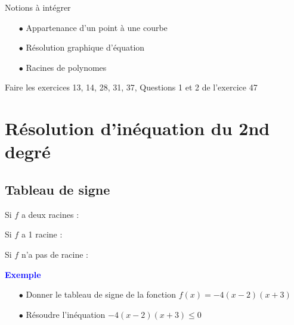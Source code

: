 \documentclass[a4paper,12pt]{article}
\begin{document}
\begin{tcolorbox}
Notions à intégrer

\begin{itemize}[noitemsep]
  \item[$\bullet$] Appartenance d'un point à une courbe
  \item[$\bullet$] Résolution graphique d'équation
  \item[$\bullet$] Racines de polynomes
\end{itemize}

\end{tcolorbox}

Faire les exercices 13, 14, 28, 31, 37, Questions 1 et 2 de l'exercice 47



\section*{Résolution d'inéquation du 2nd degré}

\subsection*{Tableau de signe}

Si \(f\) a deux racines :


Si \(f\) a 1 racine :


Si \(f\) n'a pas de racine :


\textbf{\textcolor{blue}{Exemple}} \par 

\begin{itemize}[noitemsep]
  \item[$\bullet$] Donner le tableau de signe de la fonction $f(x) = -4(x-2)(x+3)$
  \item[$\bullet$] Résoudre l'inéquation $-4(x-2)(x+3) \leq 0$
\end{itemize}
\end{document}
